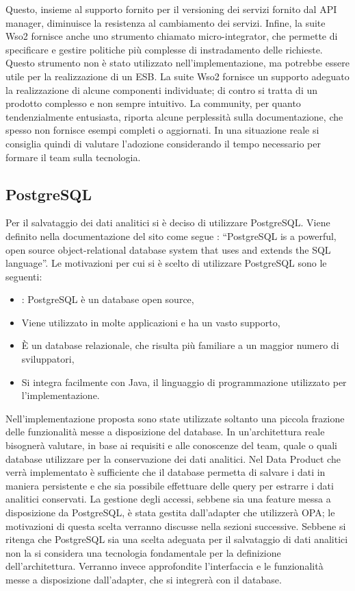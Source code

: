 \documentclass[12pt]{report}
\begin{document}
Questo, insieme al supporto fornito per il versioning dei servizi fornito dal API manager, diminuisce la resistenza al cambiamento dei servizi. 
Infine, la suite Wso2 fornisce anche uno strumento chiamato micro-integrator, che permette di specificare e gestire politiche più complesse di instradamento delle richieste.
Questo strumento non è stato utilizzato nell'implementazione, ma potrebbe essere utile per la realizzazione di un ESB.
La suite Wso2 fornisce un supporto adeguato la realizzazione di alcune componenti individuate; di contro si tratta di un prodotto complesso e non sempre intuitivo.
La community, per quanto tendenzialmente entusiasta, riporta alcune perplessità sulla documentazione, che spesso non fornisce esempi completi o aggiornati.
In una situazione reale si consiglia quindi di valutare l'adozione considerando il tempo necessario per formare il team sulla tecnologia.

\subsection{PostgreSQL}
Per il salvataggio dei dati analitici si è deciso di utilizzare PostgreSQL.
Viene definito nella documentazione del sito come segue : ``PostgreSQL is a powerful, open source object-relational database system that uses and extends the SQL language''\cite{noauthor_postgresql_nodate}.
Le motivazioni per cui si è scelto di utilizzare PostgreSQL sono le seguenti:
\begin{itemize}
    \item: PostgreSQL è un database open source,
    \item Viene utilizzato in molte applicazioni e ha un vasto supporto,
    \item È un database relazionale, che risulta più familiare a un maggior numero di sviluppatori,
    \item Si integra facilmente con Java, il linguaggio di programmazione utilizzato per l'implementazione.
\end{itemize}
Nell'implementazione proposta sono state utilizzate soltanto una piccola frazione delle funzionalità messe a disposizione del database.
In un'architettura reale bisognerà valutare, in base ai requisiti e alle conoscenze del team, quale o quali database utilizzare per la conservazione dei dati analitici.
Nel Data Product che verrà implementato è sufficiente che il database permetta di salvare i dati in maniera persistente e che sia possibile effettuare delle query per estrarre i dati analitici conservati. 
La gestione degli accessi, sebbene sia una feature messa a disposizione da PostgreSQL, è stata gestita dall'adapter che utilizzerà OPA; le motivazioni di questa scelta verranno discusse nella sezioni successive.
Sebbene si ritenga che PostgreSQL sia una scelta adeguata per il salvataggio di dati analitici non la si considera una tecnologia fondamentale per la definizione dell'architettura.
Verranno invece approfondite l'interfaccia e le funzionalità messe a disposizione dall'adapter, che si integrerà con il database.
\end{document}
